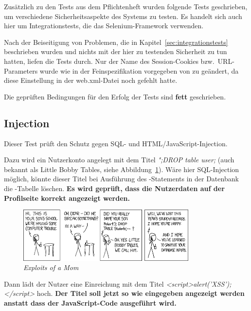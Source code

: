 
Zusätzlich zu den Tests aus dem Pflichtenheft wurden folgende Tests geschrieben,
um verschiedene Sicherheitsaspekte des Systems zu testen.
Es handelt sich auch hier um Integrationstests, die das Selenium-Framework verwenden.

Nach der Beiseitigung von Problemen, die in Kapitel~\ref{sec:integrationstests} beschrieben wurden und nichts mit der hier zu testenden Sicherheit zu tun hatten, liefen die Tests durch.
Nur der Name des Session-Cookies bzw.~URL-Parameters wurde wie in der Feinspezifikation vorgegeben von  zu  geändert, da diese Einstellung in der web.xml-Datei noch gefehlt hatte.

Die geprüften Bedingungen für den Erfolg der Tests sind \textbf{fett} geschrieben.

\subsection{Injection}\label{subsec:injection-test}
Dieser Test prüft den Schutz gegen SQL- und HTML/JavaScript-Injection.

Dazu wird ein Nutzerkonto angelegt mit dem Titel \emph{";DROP table user;} (auch bekannt als Little Bobby Tables, siehe Abbildung~\ref{fig:xkcd}).
Wäre hier SQL-Injection möglich, könnte dieser Titel bei Ausführung des -Statements in der Datenbank
die -Tabelle löschen.
\textbf{Es wird geprüft, dass die Nutzerdaten auf der Profilseite korrekt angezeigt werden.}

\begin{figure}[h]
    \centering
    \includegraphics[width=0.8\textwidth]{graphics/xkcd}
    \caption[XKCD]{\emph{Exploits of a Mom}\footnotemark}
    \label{fig:xkcd}
\end{figure}

Dann lädt der Nutzer eine Einreichung mit dem Titel \emph{<script>alert('XSS');</script>} hoch.
\textbf{Der Titel soll jetzt so wie eingegeben angezeigt werden anstatt dass der JavaScript-Code ausgeführt wird.}

